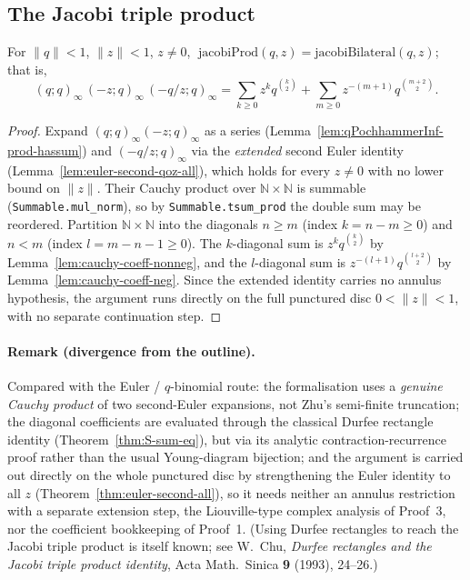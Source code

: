 \subsection{The Jacobi triple product}

\begin{theorem}\label{thm:jtp-full}\leanok{}
For $\|q\| < 1$, $\|z\| < 1$, $z \neq 0$, $\;\mathrm{jacobiProd}(q,z) =
\mathrm{jacobiBilateral}(q,z)$; that is,
\[
  (q;q)_\infty\,(-z;q)_\infty\,(-q/z;q)_\infty
    = \sum_{k\ge0} z^k q^{\binom{k}{2}} + \sum_{m\ge0} z^{-(m+1)} q^{\binom{m+2}{2}}.
\]
\end{theorem}

\begin{proof}\leanok{}
Expand $(q;q)_\infty(-z;q)_\infty$ as a series
(Lemma~\ref{lem:qPochhammerInf-prod-hassum}) and $(-q/z;q)_\infty$ via the
\emph{extended} second Euler identity (Lemma~\ref{lem:euler-second-qoz-all}),
which holds for every $z \neq 0$ with no lower bound on $\|z\|$. Their Cauchy
product over $\mathbb{N}\times\mathbb{N}$ is summable
(\texttt{Summable.mul\_norm}), so by \texttt{Summable.tsum\_prod} the double sum
may be reordered. Partition $\mathbb{N}\times\mathbb{N}$ into the diagonals
$n \ge m$ (index $k = n - m \ge 0$) and $n < m$ (index $l = m - n - 1 \ge 0$).
The $k$-diagonal sum is $z^k q^{\binom{k}{2}}$ by
Lemma~\ref{lem:cauchy-coeff-nonneg}, and the $l$-diagonal sum is
$z^{-(l+1)} q^{\binom{l+2}{2}}$ by Lemma~\ref{lem:cauchy-coeff-neg}. Since the
extended identity carries no annulus hypothesis, the argument runs directly on
the full punctured disc $0 < \|z\| < 1$, with no separate continuation step.
\end{proof}

\paragraph{Remark (divergence from the outline).} Compared with the
Euler / $q$-binomial route: the formalisation uses a \emph{genuine Cauchy product}
of two second-Euler expansions, not Zhu's semi-finite truncation; the diagonal
coefficients are evaluated through the classical Durfee rectangle identity
(Theorem~\ref{thm:S-sum-eq}), but via its analytic contraction-recurrence proof
rather than the usual Young-diagram bijection; and the argument is carried out
directly on the whole punctured disc by strengthening the Euler identity to all
$z$ (Theorem~\ref{thm:euler-second-all}), so it needs neither an annulus
restriction with a separate extension step, the Liouville-type complex analysis
of Proof~3, nor the coefficient bookkeeping of Proof~1. (Using Durfee rectangles
to reach the Jacobi triple product is itself known; see W.\ Chu,
\emph{Durfee rectangles and the Jacobi triple product identity}, Acta Math.\
Sinica \textbf{9} (1993), 24--26.)

